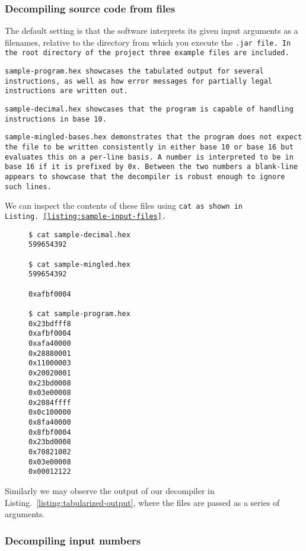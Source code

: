 \subsubsection{Decompiling source code from files}

The default setting is that the software interprets its given input
arguments as a filenames, relative to the directory from which you
execute the \tt{.jar} file. In the root directory of the project three
example files are included.

\tt{sample-program.hex} showcases the tabulated output for several
instructions, as well as how error messages for partially legal
instructions are written out.

\tt{sample-decimal.hex} showcases that the program is capable
of handling instructions in base 10. 

\tt{sample-mingled-bases.hex} demonstrates that the program does not
expect the file to be written consistently in either base 10 or base
16 but evaluates this on a per-line basis. A number is interpreted to
be in base 16 if it is prefixed by \tt{0x}. Between the two numbers
a blank-line appears to showcase that the decompiler is robust
enough to ignore such lines.

We can inspect the contents of these files using \tt{cat}
as shown in Listing.~\ref{listing:sample-input-files}.

\begin{figure}
\begin{lstlisting}[style=plain,
    caption=Sample input files,
    label=listing:sample-input-files]
$ cat sample-decimal.hex 
599654392

$ cat sample-mingled.hex
599654392

0xafbf0004

$ cat sample-program.hex
0x23bdfff8
0xafbf0004
0xafa40000
0x28880001
0x11000003
0x20020001
0x23bd0008
0x03e00008
0x2084ffff
0x0c100000
0x8fa40000
0x8fbf0004
0x23bd0008
0x70821002
0x03e00008
0x00012122
\end{lstlisting}
\end{figure}

Similarly we may observe the output of our decompiler in
Listing.~\ref{listing:tabularized-output}, where the
files are passed as a series of arguments.

\subsubsection{Decompiling input numbers}

